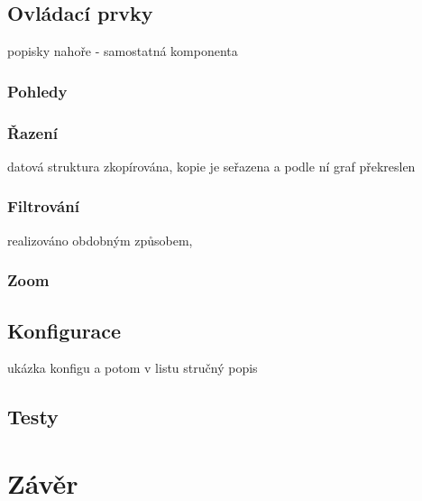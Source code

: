 \documentclass[
  digital, %
  oneside, %
  table,   %
  nolof,     %
  nolot,     %
]{fithesis3}
\begin{document}
\section{Ovládací prvky}
popisky nahoře - samostatná komponenta
\subsection{Pohledy}
\subsection{Řazení}
datová struktura zkopírována, kopie je seřazena a podle ní graf překreslen
\subsection{Filtrování}
realizováno obdobným způsobem, 
\subsection{Zoom}

\section{Konfigurace}
ukázka konfigu a potom v listu stručný popis

\section{Testy}

\chapter{Závěr}

\printbibliography
\end{document}
